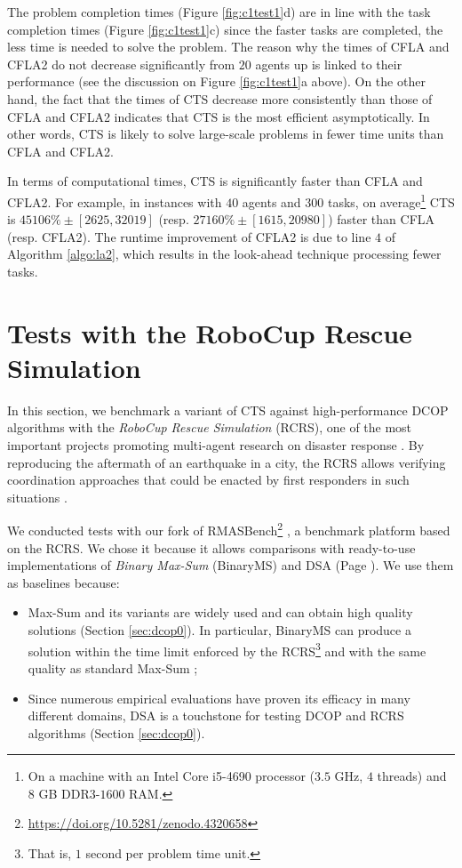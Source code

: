 The problem completion times (Figure \ref{fig:c1test1}d) are in line with the task
completion times (Figure \ref{fig:c1test1}c) since the faster tasks are completed, the
less time is needed to solve the problem. The reason why the times of CFLA and CFLA2 do
not decrease significantly from $20$ agents up is linked to their performance (see the
discussion on Figure \ref{fig:c1test1}a above). On the other hand, the fact that the times
of CTS decrease more consistently than those of CFLA and CFLA2 indicates that CTS is the
most efficient asymptotically. In other words, CTS is likely to solve large-scale problems
in fewer time units than CFLA and CFLA2.

In terms of computational times, CTS is significantly faster than CFLA and CFLA2. For
example, in instances with $40$ agents and $300$ tasks, on average\footnote{On a machine
with an Intel Core i5-4690 processor ($3.5$ GHz, $4$ threads) and $8$ GB
DDR3-$1600$ RAM.} CTS is $45106\% \pm [2625, 32019]$ (resp. $27160\% \pm [1615, 20980]$)
faster than CFLA (resp. CFLA2). The runtime improvement of CFLA2 is due to line $4$ of
Algorithm \ref{algo:la2}, which results in the look-ahead technique processing fewer
tasks.

\section{Tests with the RoboCup Rescue Simulation}\label{sec:robotests}

In this section, we benchmark a variant of CTS against high-performance DCOP algorithms
with the \emph{RoboCup Rescue Simulation} (RCRS), one of the most important projects
promoting multi-agent research on disaster response \cite{rcr1999}. By reproducing the
aftermath of an earthquake in a city, the RCRS allows verifying coordination approaches
that could be enacted by first responders in such situations \cite{rcrsmanual,rcr2001}.

We conducted tests with our fork of
RMASBench\footnote{\url{https://doi.org/10.5281/zenodo.4320658}} \cite{rmasbench}, a
benchmark platform based on the RCRS. We chose it because it allows comparisons with
ready-to-use implementations of \emph{Binary Max-Sum} (BinaryMS) \cite{pujol2015} and DSA
(Page \pageref{sec:dsa}). We use them as baselines because:
\begin{itemize}
    \item
    Max-Sum and its variants are widely used and can obtain high quality solutions
    (Section \ref{sec:dcop0}). In particular, BinaryMS can produce a solution within the
    time limit enforced by the RCRS\footnote{That is, $1$ second per problem time unit.}
    and with the same quality as standard Max-Sum
    \cite{pujol2015,pujol-gonzalez2014binary};
    \item
    Since numerous empirical evaluations have proven its efficacy in many different
    domains, DSA is a touchstone for testing DCOP and RCRS algorithms (Section
    \ref{sec:dcop0}).
\end{itemize}

